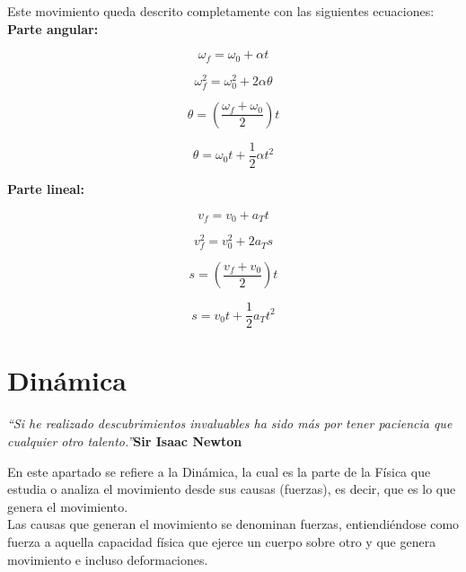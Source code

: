 \documentclass[a5paper,pagesize,10pt,bibtotoc,pointlessnumbers,
normalheadings,DIV=9,fleqn,x11names,table,twoside=false]{scrbook}
\begin{document}
Este movimiento queda descrito completamente con las siguientes ecuaciones:\\

\textbf{Parte angular:}

\begin{equation}
\omega_f = \omega_0 + \alpha t
\end{equation}

\begin{equation}
\omega_f^2 = \omega_0^2 + 2\alpha\theta
\end{equation}

\begin{equation}
\theta = (\frac{\omega_f + \omega_0}{2})t
\end{equation}

\begin{equation}
\theta = \omega_0t+\frac{1}{2}\alpha t^2
\end{equation}

\textbf{Parte lineal:}

\begin{equation}
v_f = v_0 + a_Tt
\end{equation}

\begin{equation}
v_f^2 = v_0^2 +2a_Ts
\end{equation}

\begin{equation}
s = (\frac{v_f + v_0}{2})t
\end{equation}

\begin{equation}
s = v_0t+\frac{1}{2}a_Tt^2
\end{equation}

\chapter{Dinámica}

\textit{``Si he realizado descubrimientos invaluables ha sido más por tener paciencia que cualquier otro talento.''}\textbf{Sir 
Isaac Newton}
\vspace{1.0cm}

En este apartado se refiere a la Dinámica, la cual es la parte de la Física que estudia o analiza el movimiento desde sus causas 
(fuerzas), es decir, que es lo que genera el movimiento.\\

Las causas que generan el movimiento se denominan fuerzas, entiendiéndose como fuerza a aquella capacidad física que ejerce un 
cuerpo sobre otro y que genera movimiento e incluso deformaciones.\\
\end{document}
